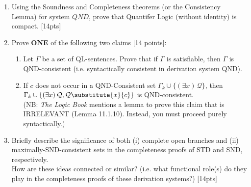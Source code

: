 \documentclass[12pt]{article}
\newcommand*{\metav}[1]{\ensuremath{\mathcal{#1}}}
\newcommand{\qt}[2]{(#1 #2) \,}
\begin{document}
\begin{enumerate}
\item Using the Soundness and Completeness theorems (or the Consistency Lemma) for system $\mathit{QND}$, prove that Quantifer Logic (without identity) is compact. [14pts] \\

\item Prove \textbf{ONE} of the following two claims [14 points]:
\begin{enumerate}
\item Let $\Gamma$ be a set of QL-sentences. Prove that if $\Gamma$ is satisfiable, then $\Gamma$ is QND-consistent (i.e. syntactically consistent in derivation system QND). 

\item If $c$ does not occur in a QND-Consistent set $\Gamma_k \cup \{ \qt{\exists}{x} \metav{Q} \}$, then $\Gamma_k \cup \{\qt{\exists}{x} \metav{Q}, \metav{Q}\substitute{x}{c} \}$ is QND-consistent. \\ (NB: \textit{The Logic Book} mentions a lemma to prove this claim that is IRRELEVANT (Lemma 11.1.10). Instead, you must proceed purely syntactically.) \\


\end{enumerate}

\item Briefly describe the significance of both (i) complete open branches and (ii) maximally-SND-consistent sets in the completeness proofs of STD and SND, respectively. \\ How are these ideas connected or similar? (i.e. what functional role(s) do they play in the completeness proofs of these derivation systems?)  [14pts]


\end{enumerate}
\end{document}
